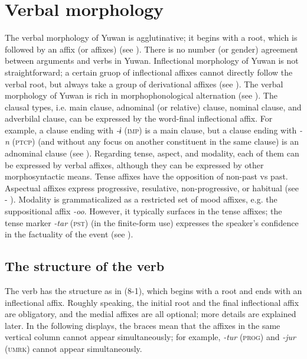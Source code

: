 \chapter{Verbal morphology}\label{chap:8}

The verbal morphology of Yuwan is agglutinative; it begins with a root, which is followed by an affix (or affixes) (see ). There is no number (or gender) agreement between arguments and verbs in Yuwan. Inflectional morphology of Yuwan is not straightforward; a certain gruop of inflectional affixes cannot directly follow the verbal root, but always take a group of derivational affixes (see ). The verbal morphology of Yuwan is rich in morphophonological alternation (see ). The clausal types, i.e. main clause, adnominal (or relative) clause, nominal clause, and adverbilal clause, can be expressed by the word-final inflectional affix. For example, a clause ending with \textit{{}-ɨ} (\textsc{imp}) is a main clause, but a clause ending with \textit{-n} (\textsc{ptcp}) (and without any focus on another constituent in the same clause) is an adnominal clause (see ). Regarding tense, aspect, and modality, each of them can be expressed by verbal affixes, although they can be expressed by other morphosyntactic means. Tense affixes have the opposition of non-past vs past. Aspectual affixes express progressive, resulative, non-progressive, or habitual (see  - ). Modality is grammaticalized as a restricted set of mood affixes, e.g. the suppositional affix \textit{{}-oo}. However, it typically surfaces in the tense affixes; the tense marker \textit{-tar} (\textsc{pst}) (in the finite-form use) expresses the speaker’s confidence in the factuality of the event (see ).

\section{The structure of the verb}
\label{bkm:Ref303739828}
The verb has the structure as in (8-1), which begins with a root and ends with an inflectional affix. Roughly speaking, the initial root and the final inflectional affix are obligatory, and the medial affixes are all optional; more details are explained later. In the following displays, the braces mean that the affixes in the same vertical column cannot appear simultaneously; for example, \textit{{}-tur} (\textsc{prog}) and \textit{{}-jur} (\textsc{umrk}) cannot appear simultaneously.

